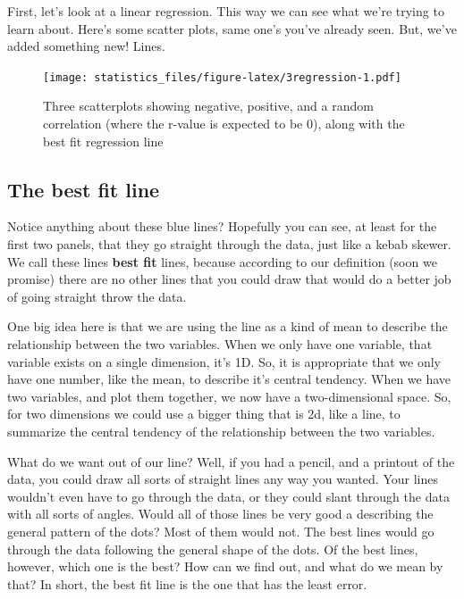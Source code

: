\documentclass[]{book}
\begin{document}
First, let's look at a linear regression. This way we can see what we're trying to learn about. Here's some scatter plots, same one's you've already seen. But, we've added something new! Lines.

\begin{figure}
\centering
\texttt{[image: statistics\_files/figure-latex/3regression-1.pdf]}
\caption{\label{fig:3regression}Three scatterplots showing negative, positive, and a random correlation (where the r-value is expected to be 0), along with the best fit regression line}
\end{figure}

\hypertarget{the-best-fit-line}{%
\subsection{The best fit line}\label{the-best-fit-line}}

Notice anything about these blue lines? Hopefully you can see, at least for the first two panels, that they go straight through the data, just like a kebab skewer. We call these lines \textbf{best fit} lines, because according to our definition (soon we promise) there are no other lines that you could draw that would do a better job of going straight throw the data.

One big idea here is that we are using the line as a kind of mean to describe the relationship between the two variables. When we only have one variable, that variable exists on a single dimension, it's 1D. So, it is appropriate that we only have one number, like the mean, to describe it's central tendency. When we have two variables, and plot them together, we now have a two-dimensional space. So, for two dimensions we could use a bigger thing that is 2d, like a line, to summarize the central tendency of the relationship between the two variables.

What do we want out of our line? Well, if you had a pencil, and a printout of the data, you could draw all sorts of straight lines any way you wanted. Your lines wouldn't even have to go through the data, or they could slant through the data with all sorts of angles. Would all of those lines be very good a describing the general pattern of the dots? Most of them would not. The best lines would go through the data following the general shape of the dots. Of the best lines, however, which one is the best? How can we find out, and what do we mean by that? In short, the best fit line is the one that has the least error.
\end{document}
